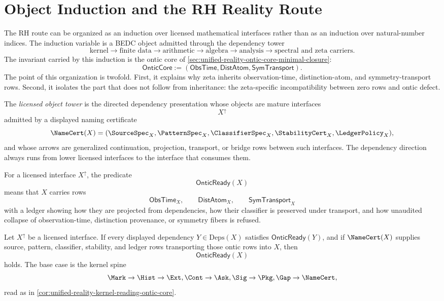 \section{Object Induction and the RH Reality Route}
\label{sec:unified-reality-object-reality-induction-rh-route}

The RH route can be organized as an induction over licensed
mathematical interfaces rather than as an induction over natural-number
indices.  The induction variable is a BEDC object admitted through the
dependency tower
$$
\text{kernel}
\to
\text{finite data}
\to
\text{arithmetic}
\to
\text{algebra}
\to
\text{analysis}
\to
\text{spectral and zeta carriers}.
$$
The invariant carried by this induction is the ontic core of
\autoref{sec:unified-reality-ontic-core-minimal-closure}:
$$
\mathsf{OnticCore}
:=
(\mathsf{ObsTime},\mathsf{DistAtom},\mathsf{SymTransport}).
$$
The point of this organization is twofold.  First, it explains why zeta
inherits observation-time, distinction-atom, and symmetry-transport rows.
Second, it isolates the part that does not follow from inheritance: the
zeta-specific incompatibility between zero rows and ontic defect.

\begin{definition}
\label{def:unified-reality-licensed-object-tower}
The \emph{licensed object tower} is the directed dependency presentation
whose objects are mature interfaces
$$
X^{\uparrow}
$$
admitted by a displayed naming certificate
$$
\NameCert(X)
=
(\SourceSpec_X,\PatternSpec_X,\ClassifierSpec_X,\StabilityCert_X,
\LedgerPolicy_X),
$$
and whose arrows are generalized continuation, projection, transport, or
bridge rows between such interfaces.  The dependency direction always
runs from lower licensed interfaces to the interface that consumes them.
\end{definition}

\begin{definition}
\label{def:unified-reality-ontic-readiness-predicate}
For a licensed interface $X^{\uparrow}$, the predicate
$$
\mathsf{OnticReady}(X)
$$
means that $X$ carries rows
$$
\mathsf{ObsTime}_X,\qquad
\mathsf{DistAtom}_X,\qquad
\mathsf{SymTransport}_X
$$
with a ledger showing how they are projected from dependencies, how their
classifier is preserved under transport, and how unaudited collapse of
observation-time, distinction provenance, or symmetry fibers is refused.
\end{definition}

\begin{principle}
\label{prin:unified-reality-object-induction-rule}
Let $X^{\uparrow}$ be a licensed interface.  If every displayed
dependency $Y\in\mathrm{Deps}(X)$ satisfies $\mathsf{OnticReady}(Y)$,
and if $\NameCert(X)$ supplies source, pattern, classifier, stability,
and ledger rows transporting those ontic rows into $X$, then
$$
\mathsf{OnticReady}(X)
$$
holds.  The base case is the kernel spine
$$
\Mark\to\Hist\to\Ext,\Cont\to\Ask,\Sig\to\Pkg,\Gap\to\NameCert,
$$
read as in
\autoref{cor:unified-reality-kernel-reading-ontic-core}.
\end{principle}

